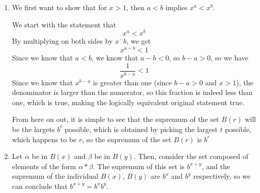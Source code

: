 \documentclass{article}
\begin{document}
\begin{solution}
\begin{enumerate}
\item We first want to show that for $x>1$, then $a<b$ implies $x^a < x^b$. 

We start with the statement that $$x^a<x^b$$By multiplying on both sides by $x^-b$, we get $$x^{a-b} < 1$$Since we know that $a<b$, we know that $a-b < 0$, so $b-a>0$, so we have $$\frac{1}{x^{b-a}} < 1$$Since we know that $x^{b-a}$ is greater than one (since $b-a > 0$ and $x>1$), the denominator is larger than the numerator, so this fraction is indeed less than one, which is true, making the logically equivalent original statement true.

From here on out, it is simple to see that the supremum of the set $B(r)$ will be the largets $b^t$ possible, which is obtained by picking the largest $t$ possible, which happens to be $r$, so the supremum of the set $B(r)$ is $b^r$

\item Let $\alpha$ be in $B(x)$ and $\beta$ be in $B(y)$. Then, consider the set composed of elements of the form $\alpha * \beta$. The supremum of this set is $b^{x+y}$, and the supremum of the individual $B(x)$, $B(y)$ are $b^x$ and $b^y$ respectively, so we can conclude that $b^{x+y} = b^xb^y$.
\end{enumerate}
\end{solution}
\end{document}
